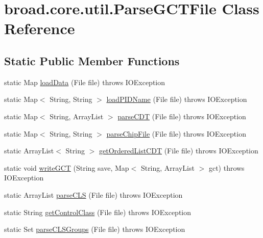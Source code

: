 \hypertarget{classbroad_1_1core_1_1util_1_1_parse_g_c_t_file}{\section{broad.\+core.\+util.\+Parse\+G\+C\+T\+File Class Reference}
\label{classbroad_1_1core_1_1util_1_1_parse_g_c_t_file}
}
\subsection*{Static Public Member Functions}
\begin{DoxyCompactItemize}
\item 
static Map \hyperlink{classbroad_1_1core_1_1util_1_1_parse_g_c_t_file_ab34d570239103d1d935f2e28c79ece78}{load\+Data} (File file)  throws I\+O\+Exception
\item 
static Map$<$ String, String $>$ \hyperlink{classbroad_1_1core_1_1util_1_1_parse_g_c_t_file_a5d4c90a27764bdc4b05398a280a66422}{load\+P\+I\+D\+Name} (File file)  throws I\+O\+Exception
\item 
static Map$<$ String, Array\+List $>$ \hyperlink{classbroad_1_1core_1_1util_1_1_parse_g_c_t_file_acbf1e9d338489f357d13c788661049a3}{parse\+C\+D\+T} (File file)  throws I\+O\+Exception
\item 
static Map$<$ String, String $>$ \hyperlink{classbroad_1_1core_1_1util_1_1_parse_g_c_t_file_a31003568b10e03202c5c9be75bd37cfb}{parse\+Chip\+File} (File file)  throws I\+O\+Exception
\item 
static Array\+List$<$ String $>$ \hyperlink{classbroad_1_1core_1_1util_1_1_parse_g_c_t_file_aa656d8a652b1fee6d5bc43464a06719f}{get\+Ordered\+List\+C\+D\+T} (File file)  throws I\+O\+Exception
\item 
static void \hyperlink{classbroad_1_1core_1_1util_1_1_parse_g_c_t_file_ad696d246f015eb1c6e3b4942d3f80fd6}{write\+G\+C\+T} (String save, Map$<$ String, Array\+List $>$ gct)  throws I\+O\+Exception
\item 
static Array\+List \hyperlink{classbroad_1_1core_1_1util_1_1_parse_g_c_t_file_a38110eb88bd4a8579120077cfacc8c8a}{parse\+C\+L\+S} (File file)  throws I\+O\+Exception
\item 
static String \hyperlink{classbroad_1_1core_1_1util_1_1_parse_g_c_t_file_aa0d127bf87abedb2695db9e582fd2946}{get\+Control\+Class} (File file)  throws I\+O\+Exception
\item 
static Set \hyperlink{classbroad_1_1core_1_1util_1_1_parse_g_c_t_file_aa97809e842fa08973d6b52c805becc3e}{parse\+C\+L\+S\+Groups} (File file)  throws I\+O\+Exception

\end{DoxyCompactItemize}
